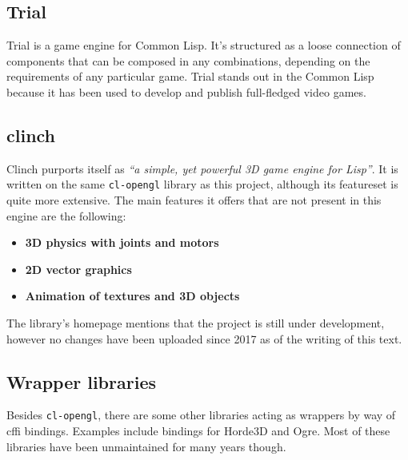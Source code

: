 \subsection{Trial}

Trial is a game engine for Common Lisp.
It's structured as a loose connection of components that can be composed in any combinations,
depending on the requirements of any particular game.
Trial stands out in the Common Lisp because it has been used to develop and publish full-fledged video games\cite{trial}.

\subsection{clinch}

Clinch purports itself as \textit{``a simple, yet powerful 3D game engine for Lisp''}. It is written on the same \texttt{cl-opengl} library as this project, although its feature\-set is quite more extensive. The main features it offers that are not present in this engine are the following\cite{clinch}:

\begin{itemize}
\item \textbf{3D physics with joints and motors}
\item \textbf{2D vector graphics}
\item \textbf{Animation of textures and 3D objects}
\end{itemize}

The library's homepage mentions that the project is still under development,
however no changes have been uploaded since 2017 as of the writing of this text.

\subsection{Wrapper libraries}

Besides \texttt{cl-opengl},
there are some other libraries acting as wrappers by way of \ac{cffi} bindings.
Examples include bindings for Horde3D\cite{horde3d} and Ogre\cite{okra}.
Most of these libraries have been unmaintained for many years though.
